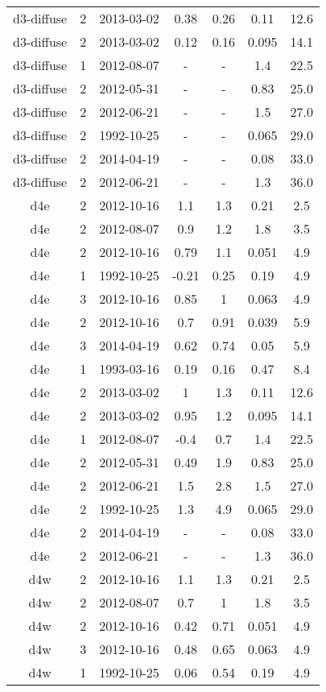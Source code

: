 \begin{table*}[htp]
\begin{tabular}{ccccccc}
d3-diffuse & 2 & 2013-03-02 & 0.38 & 0.26 & 0.11 & 12.6 \\
d3-diffuse & 2 & 2013-03-02 & 0.12 & 0.16 & 0.095 & 14.1 \\
d3-diffuse & 1 & 2012-08-07 & - & - & 1.4 & 22.5 \\
d3-diffuse & 2 & 2012-05-31 & - & - & 0.83 & 25.0 \\
d3-diffuse & 2 & 2012-06-21 & - & - & 1.5 & 27.0 \\
d3-diffuse & 2 & 1992-10-25 & - & - & 0.065 & 29.0 \\
d3-diffuse & 2 & 2014-04-19 & - & - & 0.08 & 33.0 \\
d3-diffuse & 2 & 2012-06-21 & - & - & 1.3 & 36.0 \\
d4e & 2 & 2012-10-16 & 1.1 & 1.3 & 0.21 & 2.5 \\
d4e & 2 & 2012-08-07 & 0.9 & 1.2 & 1.8 & 3.5 \\
d4e & 2 & 2012-10-16 & 0.79 & 1.1 & 0.051 & 4.9 \\
d4e & 1 & 1992-10-25 & -0.21 & 0.25 & 0.19 & 4.9 \\
d4e & 3 & 2012-10-16 & 0.85 & 1 & 0.063 & 4.9 \\
d4e & 2 & 2012-10-16 & 0.7 & 0.91 & 0.039 & 5.9 \\
d4e & 3 & 2014-04-19 & 0.62 & 0.74 & 0.05 & 5.9 \\
d4e & 1 & 1993-03-16 & 0.19 & 0.16 & 0.47 & 8.4 \\
d4e & 2 & 2013-03-02 & 1 & 1.3 & 0.11 & 12.6 \\
d4e & 2 & 2013-03-02 & 0.95 & 1.2 & 0.095 & 14.1 \\
d4e & 1 & 2012-08-07 & -0.4 & 0.7 & 1.4 & 22.5 \\
d4e & 2 & 2012-05-31 & 0.49 & 1.9 & 0.83 & 25.0 \\
d4e & 2 & 2012-06-21 & 1.5 & 2.8 & 1.5 & 27.0 \\
d4e & 2 & 1992-10-25 & 1.3 & 4.9 & 0.065 & 29.0 \\
d4e & 2 & 2014-04-19 & - & - & 0.08 & 33.0 \\
d4e & 2 & 2012-06-21 & - & - & 1.3 & 36.0 \\
d4w & 2 & 2012-10-16 & 1.1 & 1.3 & 0.21 & 2.5 \\
d4w & 2 & 2012-08-07 & 0.7 & 1 & 1.8 & 3.5 \\
d4w & 2 & 2012-10-16 & 0.42 & 0.71 & 0.051 & 4.9 \\
d4w & 3 & 2012-10-16 & 0.48 & 0.65 & 0.063 & 4.9 \\
d4w & 1 & 1992-10-25 & 0.06 & 0.54 & 0.19 & 4.9 \\

\end{tabular}
\end{table*}
